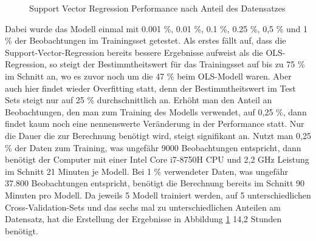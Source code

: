 \documentclass[a4paper,12pt]{thesis}
\begin{document}
\begin{figure}%
	\centering
	\qquad
	\caption{Support Vector Regression Performance nach Anteil des Datensatzes}%
	\label{fig:TrainingsShareValidation2}%
\end{figure}

Dabei wurde das Modell einmal mit 0.001 \%, 0.01 \%, 0.1 \%, 0.25 \%, 0,5 \% und 1 \% der Beobachtungen im Trainingsset getestet. Als erstes fällt auf, dass die Support-Vector-Regression bereits bessere Ergebnisse aufweist als die OLS-Regression, so steigt der Bestimmtheitswert für das Trainingsset auf bis zu 75 \% im Schnitt an, wo es zuvor noch um die 47 \% beim OLS-Modell waren. Aber auch hier findet wieder Overfitting statt, denn der Bestimmtheitswert im Test Sets steigt nur auf 25 \% durchschnittlich an. Erhöht man den Anteil an Beobachtungen, den man zum Training des Modells verwendet, auf 0,25 \%, dann findet kaum noch eine nennenswerte Veränderung in der Performance statt. Nur die Dauer die zur Berechnung benötigt wird, steigt signifikant an. Nutzt man 0,25 \% der Daten zum Training, was ungefähr 9000 Beobachtungen entspricht, dann benötigt der Computer mit einer Intel Core i7-8750H CPU und 2,2 GHz Leistung im Schnitt 21 Minuten je Modell. Bei 1 \% verwendeter Daten, was ungefähr 37.800 Beobachtungen entspricht, benötigt die Berechnung bereits im Schnitt 90 Minuten pro Modell. Da jeweils 5 Modell trainiert werden, auf 5 unterschiedlichen Cross-Validation-Sets und das sechs mal zu unterschiedlichen Anteilen am Datensatz, hat die Erstellung der Ergebnisse in Abbildung \ref{fig:TrainingsShareValidation2} 14,2 Stunden benötigt.
\end{document}
